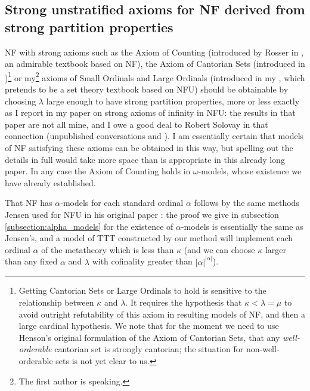 \documentclass{article}
\theoremstyle{definition}
\theoremstyle{remark}
\begin{document}
{\subsection{Strong unstratified axioms for NF derived from strong partition properties}

NF with strong axioms such as the Axiom of Counting (introduced by Rosser in \cite{rosser}, an admirable textbook based on NF), the Axiom of Cantorian Sets (introduced in \cite{henson})\footnote{Getting Cantorian Sets or Large Ordinals to hold is sensitive to the relationship between $\kappa$ and $\lambda$.  It requires the hypothesis that $\kappa<\lambda=\mu$ to avoid outright refutability of this axiom in resulting models of NF, and then a large cardinal hypothesis.  We note that for the moment we need to use Henson's original formulation of the Axiom of Cantorian Sets, that any {\em well-orderable\/} cantorian set is strongly cantorian;  the situation for non-well-orderable sets is not yet clear to us.} or my\footnote{The first author is speaking.} axioms of Small Ordinals and Large Ordinals (introduced in  my \cite{mybook}, which pretends to be a set theory textbook based on NFU) should be obtainable by choosing $\lambda$ large enough to have strong partition properties, more or less exactly as I report in my paper \cite{strongaxioms} on strong axioms of infinity in NFU:  the results in that paper are not all mine, and I owe a good deal to Robert Solovay in that connection (unpublished conversations and \cite{nfub}).   I am essentially certain that models of NF satisfying
these axioms can be obtained in this way, but spelling out the details in full would take more space than is appropriate in this already long paper.  In any case the Axiom of Counting holds in $\omega$-models, whose existence we have already established.


That NF has $\alpha$-models for each standard ordinal $\alpha$ follows by the same methods Jensen used for NFU in his original paper \cite{nfu}:  the proof we give in subsection \ref{subsection:alpha_models} for the existence of $\alpha$-models is essentially the same as Jensen's, and a model of TTT constructed by our method will implement each ordinal $\alpha$ of the metatheory which is less than $\kappa$ (and we can choose $\kappa$ larger than any fixed $\alpha$ and $\lambda$ with cofinality greater than $|\alpha|^{|\alpha|}$).

}
\end{document}
